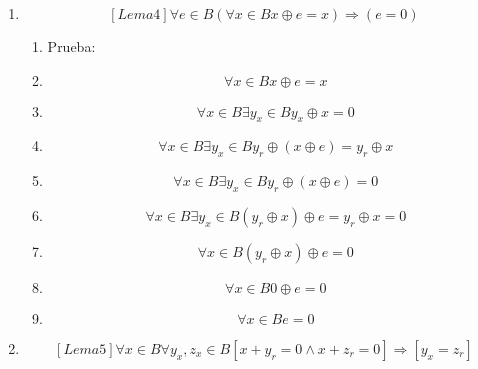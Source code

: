\begin{enumerate}
\begin{enumerate}
\begin{enumerate}
\begin{enumerate}
        \begin{enumerate}
        \def\labelenumv{\arabic{enumv}.}
        \tightlist
        \item
          Prueba:
        \item
          \[\forall{x \in B}0 \oplus {x =}\]
        \item
          \[\forall{x \in B}\exists{y_{x} \in B}{= \left( {x \oplus y_{x}} \right)} \oplus {x =}\]
        \item
          \[\forall{x \in B}\exists{y_{x} \in B}{= x} \oplus {\left( {y_{x} \oplus x} \right) =}\]
        \item
          \[\forall{x \in B}{= x} \oplus {0 = 0}\]
        \end{enumerate}
      \item
        \[\left\lbrack {{Lema}4} \right\rbrack\forall{e \in B}\left( {\forall{x \in B}x \oplus {e = x}} \right)\Rightarrow\left( {e = 0} \right)\]

        \begin{enumerate}
        \def\labelenumv{\arabic{enumv}.}
        \tightlist
        \item
          Prueba:
        \item
          \[\forall{x \in B}x \oplus {e = x}\]
        \item
          \[\forall{x \in B}\exists{y_{x} \in B}y_{x} \oplus {x = 0}\]
        \item
          \[\forall{x \in B}\exists{y_{x} \in B}y_{r} \oplus {\left( {x \oplus e} \right) = y_{r}} \oplus x\]
        \item
          \[\forall{x \in B}\exists{y_{x} \in B}y_{r} \oplus {\left( {x \oplus e} \right) = 0}\]
        \item
          \[\forall{x \in B}\exists{y_{x} \in B}\left( {y_{r} \oplus x} \right) \oplus {e = y_{r}} \oplus {x = 0}\]
        \item
          \[\forall{x \in B}\left( {y_{r} \oplus x} \right) \oplus {e = 0}\]
        \item
          \[\forall{x \in B}0 \oplus {e = 0}\]
        \item
          \[\forall{x \in B}{e = 0}\]
        \end{enumerate}
      \item
        \[\left\lbrack {{Lema}5} \right\rbrack\forall{x \in B}\forall y_{x},{z_{x} \in B}\left\lbrack {{{x + y_{r}} = {{0 \land x} + z_{r}}} = 0} \right\rbrack\Rightarrow\left\lbrack {y_{x} = z_{r}} \right\rbrack\]


\end{enumerate}
\end{enumerate}
\end{enumerate}
\end{enumerate}
